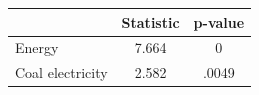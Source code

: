\begin{tabular}{l*{2}{c}}
\toprule
            &   Statistic&     p-value\\
\midrule
Energy      &       7.664&           0\\
Coal electricity&       2.582&       .0049\\
\bottomrule
\end{tabular}

